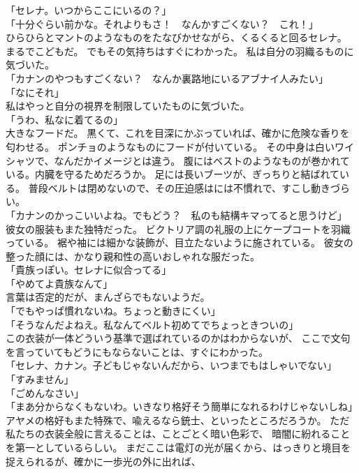 \documentclass[../IHMain]{subfiles}
\begin{document}
「セレナ。いつからここにいるの？」\\
「十分ぐらい前かな。それよりもさ！　なんかすごくない？　これ！」\\
ひらひらとマントのようなものをたなびかせながら、くるくると回るセレナ。
まるでこどもだ。
でもその気持ちはすぐにわかった。
私は自分の羽織るものに気づいた。\\
「カナンのやつもすごくない？　なんか裏路地にいるアブナイ人みたい」\\
「なにそれ」\\
私はやっと自分の視界を制限していたものに気づいた。\\
「うわ、私なに着てるの」\\
大きなフードだ。
黒くて、これを目深にかぶっていれば、確かに危険な香りを匂わせる。
ポンチョのようなものにフードが付いている。
その中身は白いワイシャツで、なんだかイメージとは違う。
腹にはベストのようなものが巻かれている。内臓を守るためだろうか。
足には長いブーツが、ぎっちりと結ばれている。
普段ベルトは閉めないので、その圧迫感はには不慣れで、すこし動きづらい。\\
「カナンのかっこいいよね。でもどう？　私のも結構キマってると思うけど」\\
彼女の服装もまた独特だった。
ビクトリア調の礼服の上にケープコートを羽織っている。
裾や袖には細かな装飾が、目立たないように施されている。
彼女の整った顔には、かなり親和性の高いおしゃれな服だった。\\
「貴族っぽい。セレナに似合ってる」\\
「やめてよ貴族なんて」\\
言葉は否定的だが、まんざらでもないようだ。\\
「でもやっぱ慣れないね。ちょっと動きにくい」\\
「そうなんだよねえ。私なんてベルト初めてでちょっときついの」\\
この衣装が一体どういう基準で選ばれているのかはわからないが、
ここで文句を言っていてもどうにもならないことは、すぐにわかった。\\
「セレナ、カナン。子どもじゃないんだから、いつまでもはしゃいでない」\\
「すみません」\\
「ごめんなさい」\\
「まあ分からなくもないわ。いきなり格好そう簡単になれるわけじゃないしね」\\
アヤメの格好もまた特殊で、喩えるなら銃士、といったところだろうか。
ただ私たちの衣装全般に言えることは、ことごとく暗い色彩で、
暗闇に紛れることを第一としているらしい。
まだここは電灯の光が届くから、はっきりと境目を捉えられるが、確かに一歩光の外に出れば、
\end{document}
